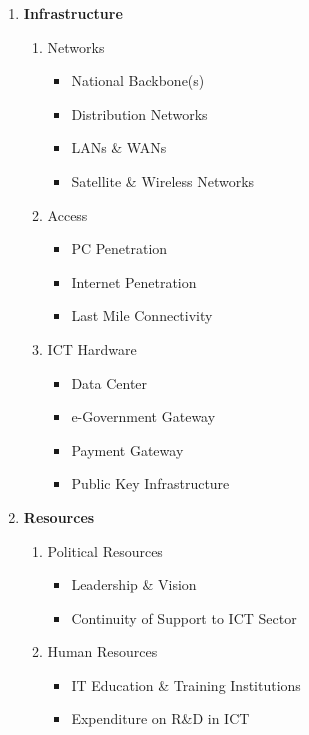 \begin{enumerate}
	\item \textbf{Infrastructure}
	      \begin{enumerate}
		      \item Networks
		            \begin{itemize}
			            \item National Backbone(s)
			            \item Distribution Networks
			            \item LANs \& WANs
			            \item Satellite \& Wireless Networks
		            \end{itemize}

		      \item Access
		            \begin{itemize}
			            \item PC Penetration
			            \item Internet Penetration
			            \item Last Mile Connectivity
		            \end{itemize}

		      \item ICT Hardware
		            \begin{itemize}
			            \item Data Center
			            \item e-Government Gateway
			            \item Payment Gateway
			            \item Public Key Infrastructure
		            \end{itemize}
	      \end{enumerate}

	\item \textbf{Resources}
	      \begin{enumerate}
		      \item Political Resources
		            \begin{itemize}
			            \item Leadership \& Vision
			            \item Continuity of Support to ICT Sector
		            \end{itemize}

		      \item Human Resources
		            \begin{itemize}
			            \item IT Education \& Training Institutions
			            \item Expenditure on R\&D in ICT
		            \end{itemize}


\end{enumerate}
\end{enumerate}
